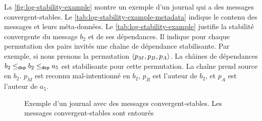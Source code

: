 La \autoref{fig:log-stability-example} montre un exemple d'un journal qui a des messages convergent-stables.
Le \autoref{tab:log-stability-example-metadata} indique le contenu des messages et leurs méta-données.
Le \autoref{tab:log-stability-example} justifie la stabilité convergente du message $b_2$ et de ses dépendances.
Il indique pour chaque permutation des pairs invités une chaîne de dépendance stabilisante.
Par exemple, si nous prenons la permutation $\tuple*{p_M, p_B, p_A}$.
La châines de dépendances $b_2 \depeq b_2 \depeq a_5$ est stabilisante pour cette permutation.
La chaîne prend source en $b_2$.
$p_M$ est reconnu mal-intentionné en $b_2$, $p_B$ est l'auteur de $b_2$, et $p_A$ est l'auteur de $a_5$.


\begin{figure}[hbt]
\centering
{}
\caption[Exemple d'un journal avec des messages convergent-stables]{Exemple d'un journal avec des messages convergent-stables.
Les messages convergent-stables sont entourés}\label{fig:log-stability-example}
\end{figure}

